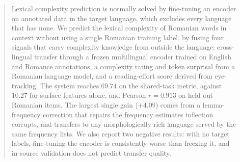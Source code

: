%

\begin{abstract}
Lexical complexity prediction is normally solved by fine-tuning an
encoder on annotated data in the target language, which excludes every
language that has none. We predict the lexical complexity of Romanian
words in context without using a single Romanian training label, by
fusing four signals that carry complexity knowledge from outside the
language: cross-lingual transfer through a frozen multilingual encoder
trained on English and Romance annotations, a complexity rating and
token surprisal from a Romanian language model, and a reading-effort
score derived from eye-tracking. The system reaches $69.74$ on the
shared-task metric, against $10.27$ for surface features alone, and
Pearson $r = 0.913$ on held-out Romanian items. The largest single gain
($+4.09$) comes from a lemma-frequency correction that repairs the
frequency estimates inflection corrupts, and transfers to any
morphologically rich language served by the same frequency lists. We
also report two negative results: with no target labels, fine-tuning
the encoder is consistently worse than freezing it, and in-source
validation does not predict transfer quality.
\end{abstract}
